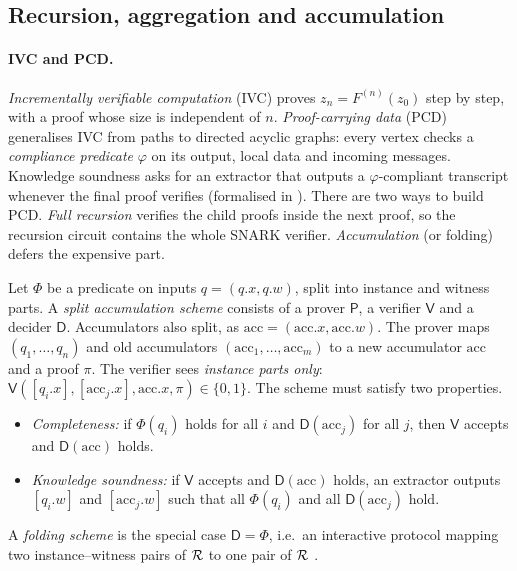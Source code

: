 \subsection{Recursion, aggregation and accumulation}\label{subsec:bg-recursion}

\paragraph{IVC and PCD.} \emph{Incrementally verifiable computation} (IVC) \cite{Val08} proves
$z_n=F^{(n)}(z_0)$ step by step, with a proof whose size is independent of $n$. \emph{Proof-carrying
data} (PCD) \cite{CT10,BCCT13} generalises IVC from paths to directed acyclic graphs: every vertex
checks a \emph{compliance predicate} $\varphi$ on its output, local data and incoming messages.
Knowledge soundness asks for an extractor that outputs a $\varphi$-compliant transcript whenever
the final proof verifies (formalised in \cite[§5]{BCMS20}). There are two ways to build PCD.
\emph{Full recursion} verifies the child proofs inside the next proof, so the recursion circuit
contains the whole SNARK verifier. \emph{Accumulation} (or folding) defers the expensive part.

\begin{definition}\label{def:bg-acc}
Let $\Phi$ be a predicate on inputs $q=(q.x,q.w)$, split into instance and witness parts. A
\emph{split accumulation scheme} consists of a prover $\mathsf{P}$, a verifier $\mathsf{V}$ and a
decider $\mathsf{D}$. Accumulators also split, as $\mathrm{acc}=(\mathrm{acc}.x,\mathrm{acc}.w)$.
The prover maps $(q_1,\dots,q_n)$ and old accumulators $(\mathrm{acc}_1,\dots,\mathrm{acc}_m)$ to a
new accumulator $\mathrm{acc}$ and a proof $\pi$. The verifier sees \emph{instance parts only}:
$\mathsf{V}([q_i.x],[\mathrm{acc}_j.x],\mathrm{acc}.x,\pi)\in\{0,1\}$. The scheme must satisfy two
properties.
\begin{itemize}[nosep]
\item \emph{Completeness:} if $\Phi(q_i)$ holds for all $i$ and $\mathsf{D}(\mathrm{acc}_j)$ for all
  $j$, then $\mathsf{V}$ accepts and $\mathsf{D}(\mathrm{acc})$ holds.
\item \emph{Knowledge soundness:} if $\mathsf{V}$ accepts and $\mathsf{D}(\mathrm{acc})$ holds, an
  extractor outputs $[q_i.w]$ and $[\mathrm{acc}_j.w]$ such that all $\Phi(q_i)$ and all
  $\mathsf{D}(\mathrm{acc}_j)$ hold.
\end{itemize}
A \emph{folding scheme} is the special case $\mathsf{D}=\Phi$, i.e.\ an interactive protocol mapping
two instance--witness pairs of $\mathcal{R}$ to one pair of $\mathcal{R}$ \cite{KST22-Nova}.
\end{definition}

